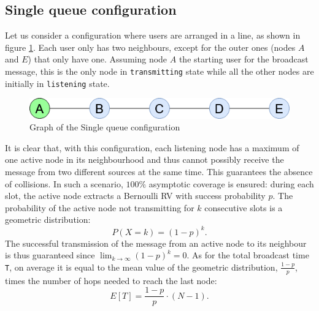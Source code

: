 \subsection{Single queue configuration}\label{ssec:singlequeue}
Let us consider a configuration where users are arranged in a line, as shown in
figure \ref{fig:single_queue}. Each user only has two neighbours, except for
the outer ones (nodes $A$ and $E$) that only have one. Assuming node $A$ the
starting user for the broadcast message, this is the only node in
\texttt{transmitting} state while all the other nodes are initially in
\texttt{listening} state. 
\begin{figure}[H]
    \begin{center}
        \includegraphics[scale=0.6]{img/single_queue.png}
        \caption{Graph of the Single queue configuration}
        \label{fig:single_queue}
    \end{center}
    \vspace*{-0.8cm}
\end{figure}
\noindent It is clear that, with this configuration, each listening node has a
maximum of one active node in its neighbourhood and thus cannot possibly receive
the message from two different sources at the same time. This guarantees the
absence of collisions. In such a scenario, $100\%$ asymptotic coverage is
ensured: during each slot, the active node extracts a Bernoulli RV with success
probability $p$. The probability of the active node not transmitting for $k$
consecutive slots is a geometric distribution:
\begin{equation}
	P(X = k) = (1 - p)^{k}.
	\label{geometric_distribution}
\end{equation}
The successful transmission of the message from an active node to its neighbour
is thus guaranteed since $\lim_{k \to \infty} (1 - p)^{k} = 0$.
As for the total broadcast time \texttt{T}, on average it is equal to the mean
value of the geometric distribution, $\frac{1 - p}{p}$, times the number of hops
needed to reach the last node:
\begin{equation}
	E[T] = \frac{1 - p}{p} \cdot (N - 1).
	\label{singleQueueMeanT}
\end{equation}
